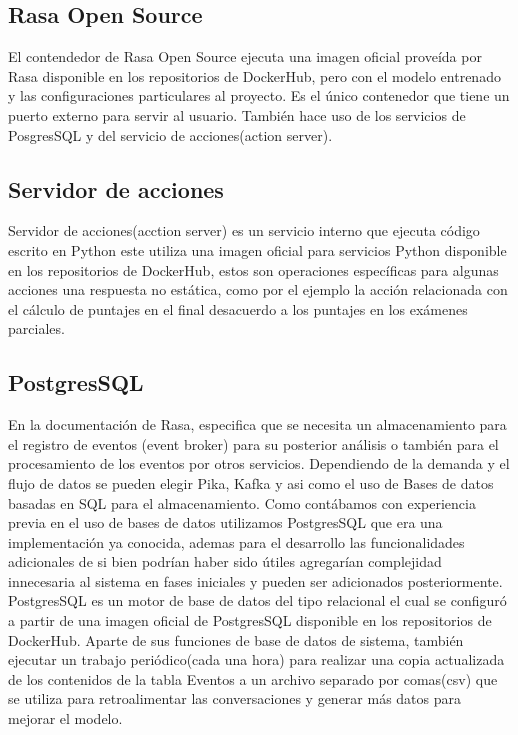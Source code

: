 \subsection{Rasa Open Source}

El contendedor de Rasa Open Source ejecuta una imagen oficial proveída por Rasa disponible en los
repositorios de DockerHub\cite{DockerHub}, pero con el modelo entrenado y las configuraciones
particulares al proyecto. Es el único contenedor que tiene un puerto externo para servir al
usuario. También hace uso de los servicios de PosgresSQL y del servicio de acciones(action server).

\subsection{Servidor de acciones}

Servidor de acciones(acction server) es un servicio interno que ejecuta código escrito en Python
este utiliza una imagen oficial para servicios Python disponible en los repositorios de
DockerHub\cite{DockerHub}, estos son operaciones específicas para algunas acciones una respuesta no
estática, como por el ejemplo la acción relacionada con el cálculo de puntajes en el final
desacuerdo a los puntajes en los exámenes parciales.

\subsection{PostgresSQL}
En la documentación de Rasa, especifica que se necesita un almacenamiento para el registro de
eventos (event broker) para su posterior análisis o también para el procesamiento de los eventos
por otros
servicios. Dependiendo de la demanda y el flujo de datos se pueden elegir Pika, Kafka y asi como
el uso de Bases de datos basadas en SQL para el almacenamiento. \cite{event_broker} Como
contábamos con experiencia previa en el uso de bases de datos utilizamos PostgresSQL que era una
implementación ya conocida, ademas para el desarrollo las funcionalidades adicionales de  si bien
podrían haber sido útiles agregarían complejidad innecesaria al sistema en fases iniciales y pueden
ser adicionados posteriormente.
PostgresSQL es un motor de base de datos del tipo relacional\cite{postgresql} el cual se configuró
a partir de una imagen oficial de PostgresSQL disponible en los repositorios de
DockerHub\cite{DockerHub}. Aparte de sus funciones de base de datos de sistema, también ejecutar un
trabajo periódico(cada una hora) para realizar una copia actualizada de los contenidos de la tabla
Eventos a un archivo separado por comas(csv) que se utiliza para retroalimentar las conversaciones
y generar más datos para mejorar el modelo.

